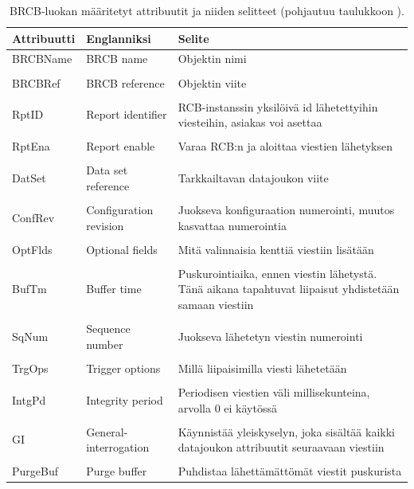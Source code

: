 \begin{table}[ht!]
	\caption{BRCB-luokan määritetyt attribuutit ja niiden selitteet (pohjautuu taulukkoon \mbox{\cite[s.~94]{IEC61850-7-2}}).}
	\label{tab:iec61850-brcb-class-definition}
	\begin{tabular}{l | l | l}
		\hline
		\textbf{Attribuutti} & \textbf{Englanniksi} & \textbf{Selite} \\
		\hline \hline
		BRCBName & BRCB name & Objektin nimi \\
		&\\
		BRCBRef & BRCB reference & Objektin viite \\
		&\\
		RptID & Report identifier & \parbox[t]{7.5cm}{RCB-instanssin yksilöivä id lähetettyihin viesteihin, asiakas voi asettaa} \\
		&\\
		RptEna & Report enable & Varaa RCB:n ja aloittaa viestien lähetyksen \\
		&\\
		DatSet & Data set reference & Tarkkailtavan datajoukon viite \\
		&\\
		ConfRev & Configuration revision & \parbox[t]{7.5cm}{Juokseva konfiguraation numerointi, muutos kasvattaa numerointia} \\
		&\\
		OptFlds & Optional fields & Mitä valinnaisia kenttiä viestiin lisätään \\
		&\\
		BufTm & Buffer time & \parbox[t]{7.5cm}{Puskurointiaika, ennen viestin lähetystä. Tänä aikana tapahtuvat liipaisut yhdistetään samaan viestiin} \\
		&\\
		SqNum & Sequence number & Juokseva lähetetyn viestin numerointi \\
		&\\
		TrgOps & Trigger options & Millä liipaisimilla viesti lähetetään \\
		&\\
		IntgPd & Integrity period & \parbox[t]{7.5cm}{Periodisen viestien väli millisekunteina, arvolla 0 ei käytössä} \\
		&\\
		GI & General-interrogation & \parbox[t]{7.5cm}{Käynnistää yleiskyselyn, joka sisältää kaikki datajoukon attribuutit seuraavaan viestiin} \\
		&\\
		PurgeBuf & Purge buffer & Puhdistaa lähettämättömät viestit puskurista \\

\end{tabular}
\end{table}
